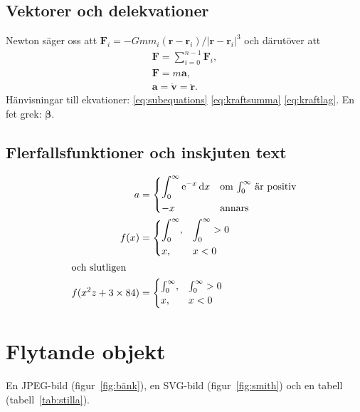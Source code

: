 \documentclass[a4paper, article, oneside, leqno]{memoir}
\begin{document}
\section{Vektorer och delekvationer}
Newton säger oss att $\mathbf{F}_i = -Gmm_i(\mathbf{r}-\mathbf{r}_i)/|\mathbf{r}-\mathbf{r}_i|^3$ och därutöver att
\begin{subequations}
  \label{eq:subequations}
  \begin{gather}
    \mathbf{F} = \sum_{i=0}^{n-1} \mathbf{F}_i, \label{eq:kraftsumma} \\
    \mathbf{F} = m\mathbf{a} \label{eq:kraftlag}, \\
    \mathbf{a} = \dot{\mathbf{v}} = \ddot{\mathbf{r}}.
  \end{gather}
\end{subequations}
Hänvisningar till ekvationer: \ref{eq:subequations} \ref{eq:kraftsumma} \ref{eq:kraftlag}. En fet grek: $\boldsymbol{\beta}$.

\section{Flerfallsfunktioner och inskjuten text}

\begin{align}
  a &=
  \begin{dcases*}
    \int_0^\infty \mathrm{e}^{-x}\,\mathrm{d}x & om $\int_0^\infty$ är positiv\\
    -x & annars
  \end{dcases*} \\
  f(x) &=
  \begin{dcases}
    \int_0^\infty, & \int_0^\infty > 0 \\
    x, & x < 0
  \end{dcases} \\
  \shortintertext{och slutligen}
  f(x^2z+3\times 84) &=
  \begin{cases}
    \int_0^\infty, & \int_0^\infty > 0 \\
    x, & x < 0
  \end{cases}
\end{align}

\chapter{Flytande objekt}

En JPEG-bild (figur~\ref{fig:bänk}), en SVG-bild (figur~\ref{fig:smith}) och en tabell (tabell~\ref{tab:stilla}).
\end{document}
